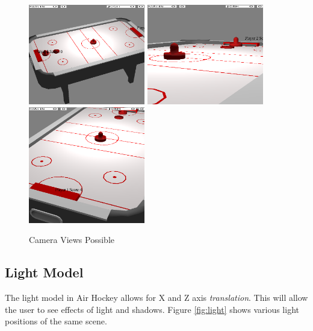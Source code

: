 \documentclass[10pt]{report}
\begin{document}
\begin{figure}[!h]
\includegraphics[width=2in]{camera1.png}
\includegraphics[width=2in]{camera2.png}
\includegraphics[width=2in]{camera3.png}
\caption{Camera Views Possible}
\label{fig:camera}
\end{figure}

\subsection*{Light Model}
The light model in Air Hockey allows for X and Z axis \emph{translation}. This will allow the user to see
effects of light and shadows. Figure \ref{fig:light} shows various light positions of the same scene.
\end{document}
